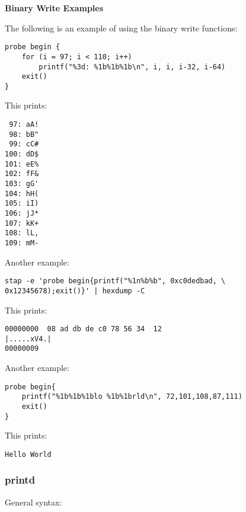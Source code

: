 \documentclass[twoside,english]{article}
\newenvironment{vindent}
{\begin{list}{}{\setlength{\listparindent}{6pt}}
\item[]}
{\end{list}}
\begin{document}
\textbf{Binary Write Examples}

The following is an example of using the binary write functions:

\begin{vindent}
\begin{verbatim}
probe begin {
    for (i = 97; i < 110; i++)
        printf("%3d: %1b%1b%1b\n", i, i, i-32, i-64)
    exit()
}
\end{verbatim}
\end{vindent}
This prints:

\begin{vindent}
\begin{verbatim}
 97: aA!
 98: bB"
 99: cC#
100: dD$
101: eE%
102: fF&
103: gG'
104: hH(
105: iI)
106: jJ*
107: kK+
108: lL,
109: mM-
\end{verbatim}
\end{vindent}
Another example:

\begin{vindent}
\begin{verbatim}
stap -e 'probe begin{printf("%1n%b%b", 0xc0dedbad, \
0x12345678);exit()}' | hexdump -C

\end{verbatim}
\end{vindent}
This prints:

\begin{vindent}
\begin{verbatim}
00000000  08 ad db de c0 78 56 34  12                       |.....xV4.|
00000009
\end{verbatim}
\end{vindent}
Another example:

\begin{vindent}
\begin{verbatim}
probe begin{
    printf("%1b%1b%1blo %1b%1brld\n", 72,101,108,87,111)
    exit()
}
\end{verbatim}
\end{vindent}
This prints:

\begin{vindent}
\begin{verbatim}
Hello World
\end{verbatim}
\end{vindent}

\subsubsection{printd}
General syntax:
\end{document}
